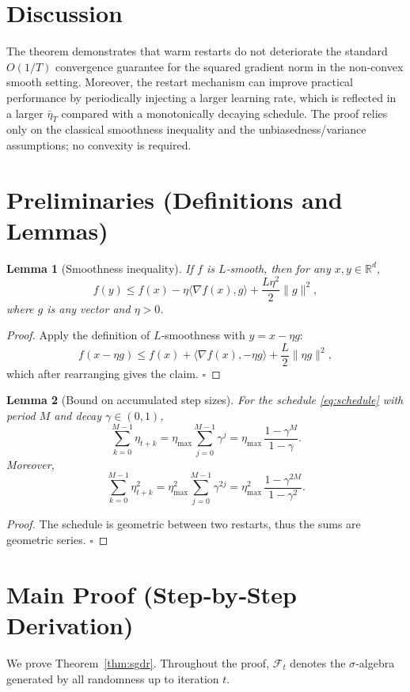 \documentclass[11pt]{article}
\newtheorem{lemma}{Lemma}
\newcommand{\R}{\mathbb{R}}
\begin{document}
\section*{Discussion}
The theorem demonstrates that warm restarts do not deteriorate the standard $O(1/T)$ convergence guarantee for the squared gradient norm in the non‑convex smooth setting. Moreover, the restart mechanism can improve practical performance by periodically injecting a larger learning rate, which is reflected in a larger $\bar\eta_T$ compared with a monotonically decaying schedule. The proof relies only on the classical smoothness inequality and the unbiasedness/variance assumptions; no convexity is required.

\newpage
\section*{Preliminaries (Definitions and Lemmas)}
\begin{lemma}[Smoothness inequality]\label{lem:smooth}
If $f$ is $L$‑smooth, then for any $x,y\in\R^{d}$,
\[
f(y)\le f(x)-\eta\langle\nabla f(x),g\rangle+\frac{L\eta^{2}}{2}\|g\|^{2},
\]
where $g$ is any vector and $\eta>0$.
\end{lemma}
\begin{proof}
Apply the definition of $L$‑smoothness with $y=x-\eta g$:
\[
f(x-\eta g)\le f(x)+\langle\nabla f(x),-\eta g\rangle+\frac{L}{2}\|\eta g\|^{2},
\]
which after rearranging gives the claim. \hfill $\square$
\end{proof}

\begin{lemma}[Bound on accumulated step sizes]\label{lem:averages}
For the schedule \eqref{eq:schedule} with period $M$ and decay $\gamma\in(0,1)$,
\[
\sum_{k=0}^{M-1}\eta_{t+k}
= \eta_{\max}\sum_{j=0}^{M-1}\gamma^{j}
= \eta_{\max}\,\frac{1-\gamma^{M}}{1-\gamma}.
\tag{3}
\]
Moreover,
\[
\sum_{k=0}^{M-1}\eta_{t+k}^{2}
= \eta_{\max}^{2}\sum_{j=0}^{M-1}\gamma^{2j}
= \eta_{\max}^{2}\,\frac{1-\gamma^{2M}}{1-\gamma^{2}}.
\tag{4}
\]
\end{lemma}
\begin{proof}
The schedule is geometric between two restarts, thus the sums are geometric series. \hfill $\square$
\end{proof}

\section*{Main Proof (Step‑by‑Step Derivation)}
We prove Theorem~\ref{thm:sgdr}. Throughout the proof, $\mathcal{F}_t$ denotes the $\sigma$‑algebra generated by all randomness up to iteration $t$.
\end{document}
